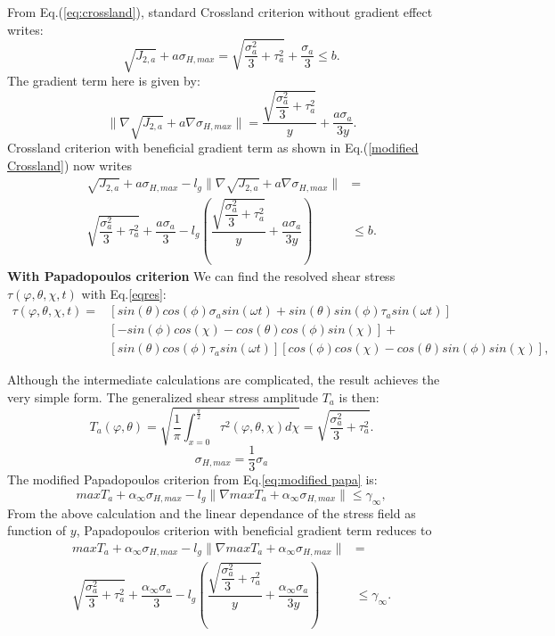 \documentclass[3p,times,procedia,number]{elsarticle}
\begin{document}
\noindent From Eq.(\ref{eq:crossland}), standard Crossland criterion without gradient effect writes:
\begin{equation}
\sqrt{J_{2,a}}+a\sigma_{H,max}=\sqrt{\dfrac{\sigma_a^2}{3}+\tau_a^2}+\dfrac{\sigma_a}{3}\leqslant b.
\label{eqrbcross}
\end{equation}
The gradient term here is given by:
\begin{equation}
\parallel{\nabla\sqrt{J_{2,a}}}+a{\nabla \sigma_{H,max}}\parallel= \dfrac{\sqrt{\dfrac{\sigma_a^2}{3}+\tau_a^2}}{y}+\dfrac{a\sigma_a}{3y}.
\end{equation}
Crossland criterion with beneficial gradient term as shown in Eq.(\ref{modified Crossland}) now writes
\begin{equation}
\begin{split}
\sqrt{J_{2,a}}+a\sigma_{H,max}-l_g\parallel{\nabla\sqrt{J_{2,a}}}+a\nabla{\sigma_{H,max}}\parallel&=\\\sqrt{\dfrac{\sigma_a^2}{3}+\tau_a^2}+\dfrac{a\sigma_a}{3}-l_g\left( \dfrac{\sqrt{\dfrac{\sigma_a^2}{3}+\tau_a^2}}{y}+\dfrac{a\sigma_a}{3y}\right) &\leqslant b.
\end{split}
\end{equation}
\textbf{With Papadopoulos criterion}
We can find the resolved shear stress $\tau(\varphi,\theta,\chi ,t)$ with Eq.\eqref{eqres}:
\begin{equation}
\begin{split}
\tau(\varphi,\theta,\chi ,t)=&[sin(\theta) cos(\phi)\sigma_a sin(\omega t) + sin(\theta) sin(\phi) \tau_a sin(\omega t)] \\&[-sin(\phi)cos(\chi)-cos(\theta)cos(\phi)sin(\chi)]+\\&[sin(\theta)cos(\phi) \tau_a sin(\omega t)][cos(\phi) cos(\chi)-cos(\theta) sin(\phi) sin(\chi)] ,
\end{split}
\end{equation}

Although the intermediate calculations are complicated, the result achieves the very simple form\cite{Papadopoulos1997219}. The generalized shear stress amplitude $T_a$ is then:
$$T_a(\varphi,\theta)=\sqrt{\dfrac{1}{\pi}\int_{x=0}^{\frac{\pi}{2}} \tau^2(\varphi,\theta,\chi)d\chi}
=\sqrt{\dfrac{\sigma_a^2}{3}+\tau_a^2}.
$$
$$\sigma_{H,max}=\dfrac{1}{3}\sigma_a$$
The modified Papadopoulos criterion from Eq.\eqref{eq:modified papa} is:
$$maxT_a+\alpha_\infty\sigma_{H,max}-l_g\parallel\nabla{maxT_a}+\alpha_\infty\sigma_{H,max}\parallel\leqslant \gamma_\infty,$$
From the above calculation and the linear dependance of the stress field as function of $y$, 
Papadopoulos criterion with beneficial gradient term reduces to 
\begin{equation}
\begin{split}
maxT_a+\alpha_\infty\sigma_{H,max}-l_g\parallel\nabla{maxT_a}+\alpha_\infty\sigma_{H,max}\parallel&=\\\sqrt{\dfrac{\sigma_a^2}{3}+\tau_a^2}+\dfrac{\alpha_\infty\sigma_a}{3}-l_g\left( \dfrac{\sqrt{\dfrac{\sigma_a^2}{3}+\tau_a^2}}{y}+\dfrac{\alpha_\infty\sigma_a}{3y}\right) &\leqslant \gamma_\infty.
\end{split}
\label{modified Papadopoulos}
\end{equation}
\end{document}
